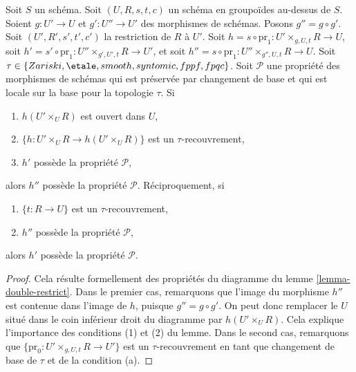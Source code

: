 \begin{lemma}
\label{lemma-double-restrict-property}
Soit $S$ un schéma.
Soit $(U, R, s, t, c)$ un schéma en groupoïdes au-dessus de $S$.
Soient $g : U' \to U$ et $g' : U'' \to U'$ des morphismes de schémas.
Posons $g'' = g \circ g'$.
Soit $(U', R', s', t', c')$ la restriction de $R$ à $U'$.
Soit $h = s \circ \text{pr}_1 : U' \times_{g, U, t} R \to U$,
soit $h' = s' \circ \text{pr}_1 : U'' \times_{g', U', t} R \to U'$, et
soit $h'' = s \circ \text{pr}_1 : U'' \times_{g'', U, t} R \to U$.
Soit $\tau \in \{Zariski, \linebreak[0] \etale, \linebreak[0]
smooth, \linebreak[0] syntomic, \linebreak[0] fppf, \linebreak[0] fpqc\}$. Soit
$\mathcal{P}$ une propriété des morphismes de schémas
qui est préservée par changement de base et qui
est locale sur la base pour la topologie $\tau$. Si
\begin{enumerate}
\item $h(U' \times_U R)$ est ouvert dans $U$,
\item $\{h : U' \times_U R \to h(U' \times_U R)\}$ est un $\tau$-recouvrement,
\item $h'$ possède la propriété $\mathcal{P}$,
\end{enumerate}
alors $h''$ possède la propriété $\mathcal{P}$. Réciproquement, si
\begin{enumerate}
\item[(a)] $\{t : R \to U\}$ est un $\tau$-recouvrement,
\item[(d)] $h''$ possède la propriété $\mathcal{P}$,
\end{enumerate}
alors $h'$ possède la propriété $\mathcal{P}$.
\end{lemma}

\begin{proof}
Cela résulte formellement des propriétés du diagramme du
lemme \ref{lemma-double-restrict}.
Dans le premier cas, remarquons que l'image du morphisme
$h''$ est contenue dans l'image de $h$, puisque $g'' = g \circ g'$.
On peut donc remplacer le $U$ situé dans le coin inférieur droit du
diagramme par $h(U' \times_U R)$. Cela explique l'importance des
conditions (1) et (2) du lemme. Dans le second cas, remarquons que
$\{\text{pr}_0 : U' \times_{g, U, t} R \to U'\}$ est un $\tau$-recouvrement
en tant que changement de base de $\tau$ et de la condition (a).
\end{proof}







